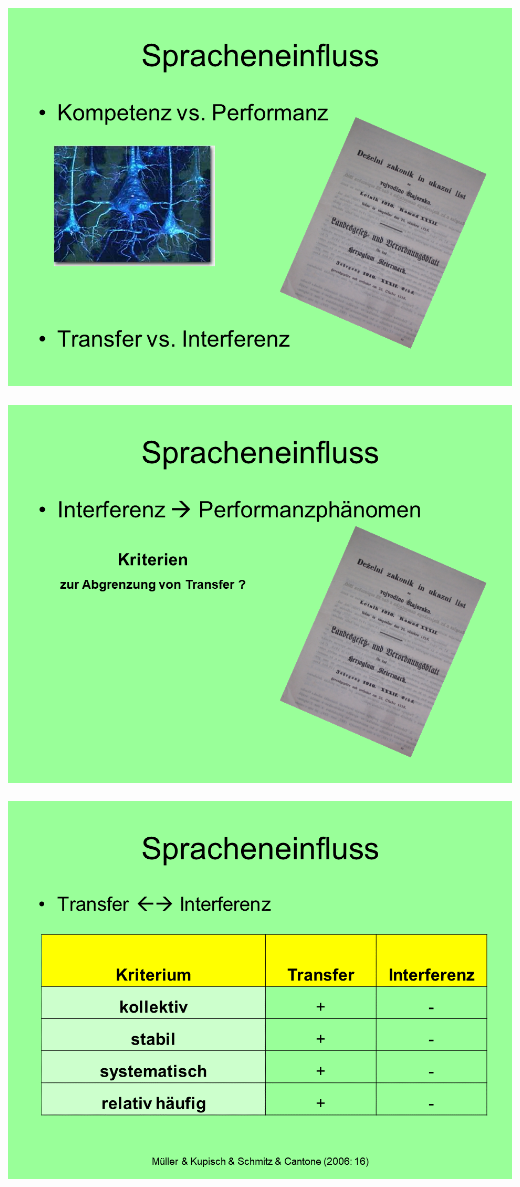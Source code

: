 \documentclass[
  letterpaper,
]{scrbook}
\begin{document}
\includegraphics[width=1\textwidth,height=\textheight]{./pictures/02_Spracheneinfluss_Sprachentrennung/Diapozitiv16.PNG}

\includegraphics[width=1\textwidth,height=\textheight]{./pictures/02_Spracheneinfluss_Sprachentrennung/Diapozitiv17.PNG}

\includegraphics[width=1\textwidth,height=\textheight]{./pictures/02_Spracheneinfluss_Sprachentrennung/Diapozitiv18.PNG}
\end{document}
